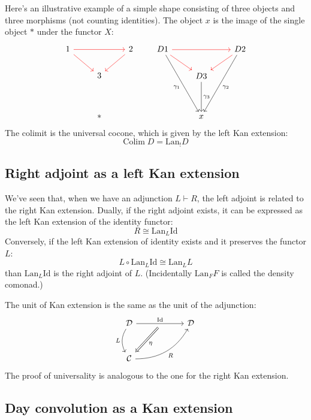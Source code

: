 \documentclass[DaoFP]{subfiles}
\begin{document}
Here's an illustrative example of a simple shape consisting of three objects and three morphisms (not counting identities). The object $x$ is the image of the single object $*$ under the functor $X$:
\[
 \begin{tikzcd}
1 
\arrow[rr, red]
\arrow[rd, red]
&& 2
\arrow[dl, red]
\\
& 3
\\
\\
& *
 \end{tikzcd}
 \qquad
 \begin{tikzcd}
D 1 
\arrow[rr, red]
\arrow[rd, red]
\arrow[dddr, "\gamma_1"']
&& D 2
\arrow[dl, red]
\arrow[dddl, "\gamma_2"]
\\
& D 3
\arrow[dd, "\gamma_3"]
\\
\\
&x
 \end{tikzcd}
 \]
The colimit is the universal cocone, which is given by the left Kan extension:
\[ \text{Colim}\; D = \text{Lan}_! D \]


\subsection{Right adjoint as a left Kan extension}

We've seen that, when we have an adjunction $L \vdash R$, the left adjoint is related to the right Kan extension. Dually, if the right adjoint exists, it can be expressed as the left Kan extension of the identity functor:
\[ R \cong \text{Lan}_L \text{Id} \]
Conversely, if the left Kan extension of identity exists and it preserves the functor $L$:
\[ L \circ \text{Lan}_L \text{Id} \cong \text{Lan}_L L \]
than $\text{Lan}_L \text{Id}$ is the right adjoint of $L$. (Incidentally $\text{Lan}_F F$ is called the density comonad.)

The unit of Kan extension is the same as the unit of the adjunction:
\[
 \begin{tikzcd} [row sep=1cm, column sep=1cm]
 \cat D
 \arrow[rr, "\text{Id}", "" {name=ID, below} ]
 \arrow[d, bend right, "L"']
 && \cat D
 \\
 \cat C
  \arrow[urr, bend right, "R"']
 \arrow[Rightarrow, "\eta",  from=ID]
 \end{tikzcd}
\]
The proof of universality is analogous to the one for the right Kan extension.

\subsection{Day convolution as a Kan extension}
\end{document}
